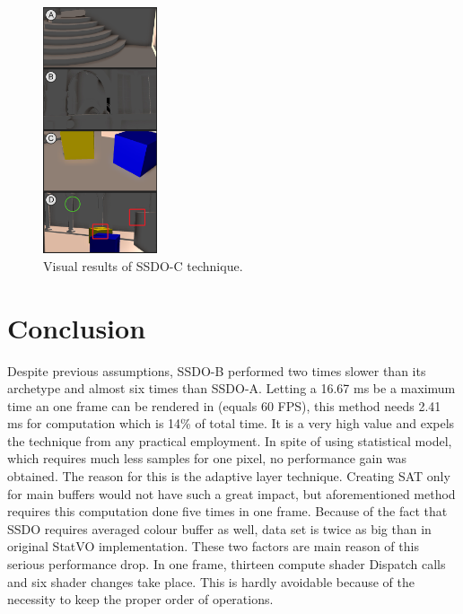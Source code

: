 \documentclass[10pt,journal,compsoc,twoside]{IEEEtran}
\begin{document}
	\begin{figure}[ht]
		\centering
		\includegraphics[width=0.3\textwidth]{fig_4_C.png}
		\caption{Visual results of SSDO-C technique.}
		\label{fig:4_C}
	\end{figure}

	\pagebreak

\section{Conclusion}\label{t:conclusion}

Despite previous assumptions, SSDO-B performed two times slower than its archetype and almost six times than SSDO-A. Letting a 16.67 ms be a maximum time an one frame can be rendered in (equals 60 FPS), this method needs 2.41 ms for computation which is 14\% of total time. It is a very high value and expels the technique from any practical employment. In spite of using statistical model, which requires much less samples for one pixel, no performance gain was obtained. The reason for this is the adaptive layer technique. Creating SAT only for main buffers would not have such a great impact, but aforementioned method requires this computation done five times in one frame. Because of the fact that SSDO requires averaged colour buffer as well, data set is twice as big than in original StatVO implementation. These two factors are main reason of this serious performance drop. In one frame, thirteen compute shader Dispatch calls and six shader changes take place. This is hardly avoidable because of the necessity to keep the proper order of operations.
\end{document}
